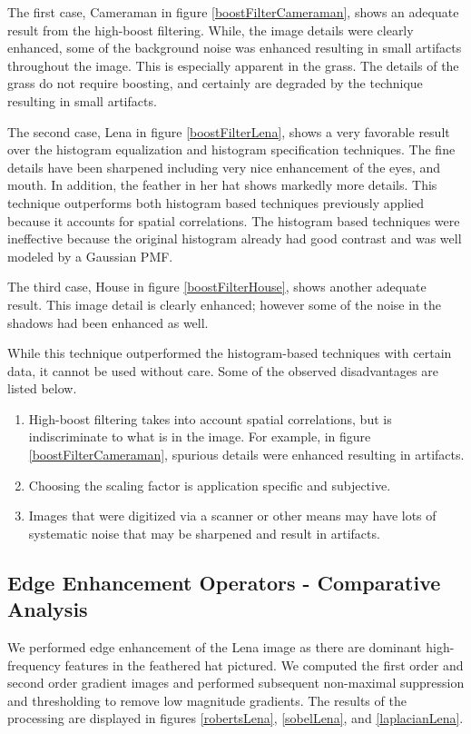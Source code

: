 \documentclass[journal]{IEEEtran}
\begin{document}
\par The first case, Cameraman in figure \ref{boostFilterCameraman}, shows an adequate result from the high-boost filtering. While, the image details were clearly enhanced, some of the background noise was enhanced resulting in small artifacts throughout the image. This is especially apparent in the grass. The details of the grass do not require boosting, and certainly are degraded by the technique resulting in small artifacts.
\par The second case, Lena in figure \ref{boostFilterLena}, shows a very favorable result over the histogram equalization and histogram specification techniques. The fine details have been sharpened including very nice enhancement of the eyes, and mouth. In addition, the feather in her hat shows markedly more details. This technique outperforms both histogram based techniques previously applied because it accounts for spatial correlations. The histogram based techniques were ineffective because the original histogram already had good contrast and was well modeled by a Gaussian PMF.
\par The third case, House in figure \ref{boostFilterHouse}, shows another adequate result. This image detail is clearly enhanced; however some of the noise in the shadows had been enhanced as well.
\par While this technique outperformed the histogram-based techniques with certain data, it cannot be used without care. Some of the observed disadvantages are listed below.
\begin{enumerate}
\item High-boost filtering takes into account spatial correlations, but is indiscriminate to what is in the image. For example, in figure \ref{boostFilterCameraman}, spurious details were enhanced resulting in artifacts.
\item Choosing the scaling factor is application specific and subjective.
\item Images that were digitized via a scanner or other means may have lots of systematic noise that may be sharpened and result in artifacts.
\end{enumerate}

\subsection{Edge Enhancement Operators - Comparative Analysis}
We performed edge enhancement of the Lena image as there are dominant high-frequency features in the feathered hat pictured. We computed the first order and second order gradient images and performed subsequent non-maximal suppression and thresholding to remove low magnitude gradients.  The results of the processing are displayed in figures \ref{robertsLena}, \ref{sobelLena}, and \ref{laplacianLena}.
\end{document}
